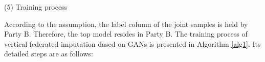 \documentclass[final,1p,times]{elsarticle}
\begin{document}
(5) Training process

According to the assumption, the label column of the joint samples is held by Party B. Therefore, the top model resides in Party B. The training process of vertical federated imputation dased on GANs is presented in Algorithm \ref{alg1}. Its detailed steps are as follows:
\end{document}
